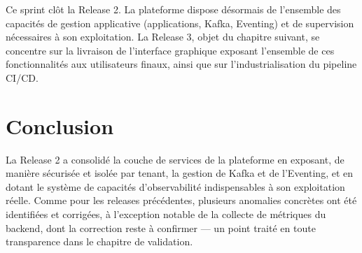 Ce sprint clôt la Release 2. La plateforme dispose désormais de l'ensemble des capacités de gestion applicative (applications, Kafka, Eventing) et de supervision nécessaires à son exploitation. La Release 3, objet du chapitre suivant, se concentre sur la livraison de l'interface graphique exposant l'ensemble de ces fonctionnalités aux utilisateurs finaux, ainsi que sur l'industrialisation du pipeline CI/CD.

\section{Conclusion}

La Release 2 a consolidé la couche de services de la plateforme en exposant, de manière sécurisée et isolée par tenant, la gestion de Kafka et de l'Eventing, et en dotant le système de capacités d'observabilité indispensables à son exploitation réelle. Comme pour les releases précédentes, plusieurs anomalies concrètes ont été identifiées et corrigées, à l'exception notable de la collecte de métriques du backend, dont la correction reste à confirmer — un point traité en toute transparence dans le chapitre de validation.
